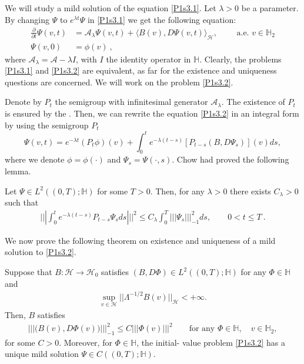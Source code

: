 \documentclass[review, onefignum, onetabnum]{siamart171218}
\begin{document}
We will study a mild solution of the equation \eqref{P1s3.1}. Let $\lambda>0$
be a parameter. By changing $\Psi$ to $e^{\lambda t}\Psi$ in
\eqref{P1s3.1} we get the following equation:
\begin{align*}
    \label{P1s3.2}
    \frac{\partial}{\partial t}\Psi(v,t)
        &= \mathcal{A}_\lambda\Psi(v,t)
        +
        \langle
            B(v),D\Psi(v,t)
        \rangle_\mathcal{H},
        \qquad \text{ a.e. }
        v \in \mathbb{H}_2
    \\
    \Psi(v,0)
        &= \phi(v) \ ,
\end{align*}
where $\mathcal{A}_\lambda=\mathcal{A}-\lambda I$, with $I$ the identity
operator in $\mathbb{H}$. Clearly, the problems \eqref{P1s3.1} and
\eqref{P1s3.2} are equivalent, as far for the existence and uniqueness
questions are concerned. We will work on the problem \eqref{P1s3.2}.

    Denote by $P_t$ the semigroup with infinitesimal generator
$\mathcal{A}_\lambda$. The existence of $P_t$ is ensured by the
.
Then, we can rewrite the equation \eqref{P1s3.2} in an integral form by using
the semigroup $P_t$
\begin{equation}
    \Psi(v,t)=
        e^{-\lambda t} (P_t\phi)(v)
        +
        \int_0^t  e^{-\lambda(t-s)}[P_{t-s}(B,D\Psi_s)](v) ds,
\end{equation}
where we denote $\phi=\phi(\cdot)$ and $\Psi_s=\Psi(\cdot,s)$.
Chow \cite{liu} had proved the following lemma.

\begin{lemma}\label{Lemma.s3.1}
    Let $\Psi\in L^2((0,T);\mathbb{H})$ for some $T>0$. Then, for any
    $\lambda>0$ there exists $C_\lambda>0$ such that
     \begin{align}
        |||\int_0^t e^{-\lambda (t-s)} P_{t-s} \Psi_{s} ds |||^2 \le C_\lambda
        \int_0^T |||\Psi_s|||_{-1}^2 ds,
        \qquad 0< t\le T
        \ .
        \label{s3.1.0}
     \end{align}
\end{lemma}

    We now prove the following theorem on existence and uniqueness of a mild
    solution to \eqref{P1s3.2}.
\begin{theorem}
    \label{Th-EU}
    Suppose that $B:\mathcal{H}\rightarrow \mathcal{H}_0$ satisfies
    $
        (B,D\Phi)\in
        L^2((0,T);\mathbb{H})
    $ for any $\Phi\in\mathbb{H}$ and
    \begin{align}
        \sup_{v\in \mathcal{H}} ||\Lambda^{-1/2}B(v)||_{\mathcal{H}}
            <+\infty.
    \end{align}
    Then, $B$ satisfies
    \begin{align}
        ||| \big(B(v),D\Phi(v) \big) |||_{-1}^2 \le C |||\Phi(v) |||^2  \qquad
        \mbox{for any } \Phi\in \mathbb{H},
        \quad v\in \mathbb{H}_2 ,
        \label{s3.1.1}
    \end{align}
    for some $C>0$.
    Moreover, for $\Phi\in \mathbb{H}$, the initial- value problem
    \eqref{P1s3.2} has a unique mild solution
    $\Psi\in C((0,T); \mathbb{H})$.
\end{theorem}
\end{document}
